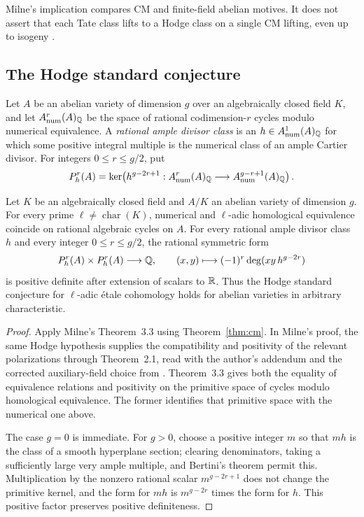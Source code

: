 Milne's implication compares CM and finite-field abelian motives. It
does not assert that each Tate class lifts to a Hodge class on a
single CM lifting, even up to isogeny
\cite[Introduction, Remark~(a)]{Milne1999Tate}.

\subsection{The Hodge standard conjecture}

Let \(A\) be an abelian variety of dimension \(g\) over an
algebraically closed field \(K\), and let
\(A^r_{\mathrm{num}}(A)_{\mathbb{Q}}\) be the space of rational
codimension-\(r\) cycles modulo numerical equivalence. A
\emph{rational ample divisor class} is an
\(h\in A^1_{\mathrm{num}}(A)_{\mathbb{Q}}\) for which some positive integral
multiple is the numerical class of an ample Cartier divisor. For
integers \(0\le r\le g/2\), put
\[
 P_h^r(A)=\ker\!\left(
 h^{g-2r+1}:A^r_{\mathrm{num}}(A)_{\mathbb{Q}}
 \longrightarrow A^{g-r+1}_{\mathrm{num}}(A)_{\mathbb{Q}}\right).
\]

\begin{corollary}
\label{cc:standard}
Let \(K\) be an algebraically closed field and \(A/K\) an abelian
variety of dimension \(g\). For every prime
\(\ell\ne\operatorname{char}(K)\), numerical
and \(\ell\)-adic homological equivalence coincide on rational
algebraic cycles on \(A\). For every rational ample divisor class
\(h\) and every integer \(0\le r\le g/2\), the rational symmetric form
\[
 P_h^r(A)\times P_h^r(A)\longrightarrow\mathbb{Q},\qquad
 (x,y)\longmapsto(-1)^r\deg(xy\,h^{g-2r})
\]
is positive definite after extension of scalars to \(\mathbb{R}\). Thus the
Hodge standard conjecture for \(\ell\)-adic étale cohomology holds
for abelian varieties in arbitrary characteristic.
\end{corollary}

\begin{proof}
Apply Milne's Theorem~3.3 \cite{Milne2002Polarizations} using
Theorem~\ref{thm:cm}. In Milne's proof, the same Hodge hypothesis
supplies the compatibility and positivity of the relevant
polarizations through Theorem~2.1, read with the author's addendum
\cite{cc:Milne2002Addendum} and the corrected auxiliary-field choice
from \cite{cc:Milne1999Addenda}. Theorem~3.3 gives both the equality
of equivalence relations and positivity on the primitive space of
cycles modulo homological equivalence. The former identifies that
primitive space with the numerical one above.

The case \(g=0\) is immediate. For \(g>0\), choose a positive integer
\(m\) so that \(mh\) is the class of a smooth hyperplane section;
clearing denominators, taking a sufficiently large very ample
multiple, and Bertini's theorem permit this. Multiplication by the
nonzero rational scalar \(m^{g-2r+1}\) does not change the primitive
kernel, and the form for \(mh\) is \(m^{g-2r}\) times the form for
\(h\). This positive factor preserves positive definiteness.
\end{proof}

